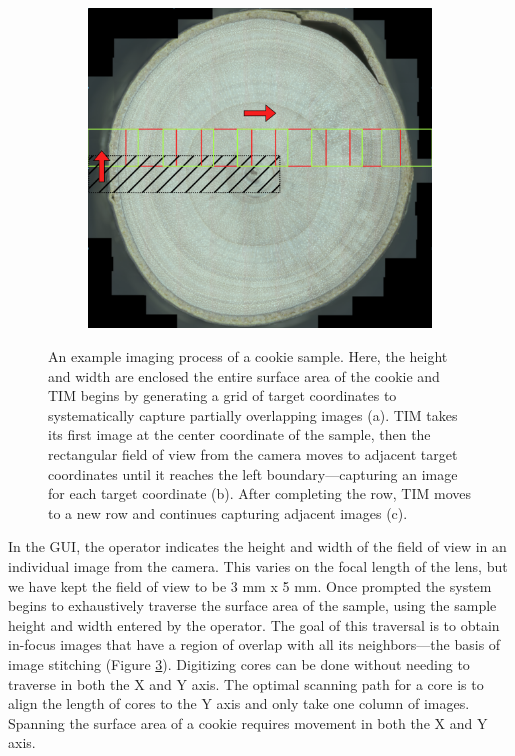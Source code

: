 \documentclass[a4paper,12pt]{article}
\begin{document}
\begin{figure}
\begin{subfigure}{.3\textwidth}
      \caption{}
      \label{SUBFIGURE LABEL 2}
  \end{subfigure}
  \begin{subfigure}{.3\textwidth}
      \centering
      \includegraphics[width=.95\linewidth]{../content/cookie_figure_second_row.png}  
      \caption{}
      \label{SUBFIGURE LABEL 3}
  \end{subfigure} %
  \caption{An example imaging process of a cookie sample. Here, the height and width are enclosed the entire surface area of the cookie and TIM begins by generating a grid of target coordinates to systematically capture partially overlapping images (a). TIM takes its first image at the center coordinate of the sample, then the rectangular field of view from the camera moves to adjacent target coordinates until it reaches the left boundary---capturing an image for each target coordinate (b). After completing the row, TIM moves to a new row and continues capturing adjacent images (c). }
  \label{FIGURE LABEL}
  \end{figure}

In the GUI, the operator indicates the height and width of the field of view in an individual image from the camera. 
This varies on the focal length of the lens, but we have kept the field of view to be 3 mm x 5 mm. 
Once prompted the system begins to exhaustively traverse the surface area of the sample, using the sample height and width entered by the operator.  
The goal of this traversal is to obtain in-focus images that have a region of overlap with all its neighbors---the basis of image stitching (Figure \ref{FIGURE LABEL}). 
Digitizing cores can be done without needing to traverse in both the X and Y axis. 
The optimal scanning path for a core is to align the length of cores to the Y axis and only take one column of images.
Spanning the surface area of a cookie requires movement in both the X and Y axis.
\end{document}
